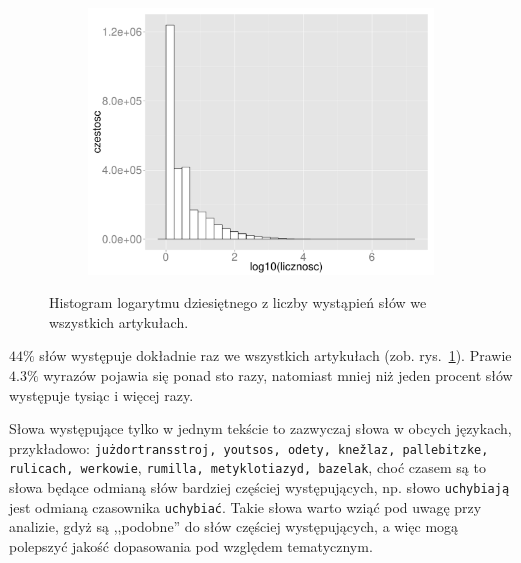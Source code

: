 \documentclass{praca1}
\begin{document}
\begin{figure}[!h]
  \centering
  \includegraphics[width=350pt, height=200pt]{plot2.pdf}\\
  \caption{Histogram logarytmu dziesiętnego z liczby wystąpień słów we wszystkich artykułach.}\label{plot:002}
\end{figure}

$44\%$ słów występuje dokładnie raz we wszystkich artykułach (zob. rys.~\ref{plot:002}). Prawie $4.3\%$ wyrazów pojawia się ponad sto razy, natomiast mniej niż jeden procent słów występuje tysiąc i więcej razy.

Słowa występujące tylko w jednym tekście to zazwyczaj słowa w obcych językach, przykładowo: \verb|jużdortransstroj, youtsos, odety, knežlaz, pallebitzke, rulicach, werkowie|, \verb|rumilla, metyklotiazyd, bazelak|,
choć czasem są to słowa będące odmianą słów bardziej częściej występujących, np. słowo \verb|uchybiają| jest odmianą czasownika \verb|uchybiać|. Takie słowa warto wziąć pod uwagę przy analizie, gdyż są ,,podobne'' do słów częściej występujących, a więc mogą polepszyć jakość dopasowania pod względem tematycznym.
\end{document}
